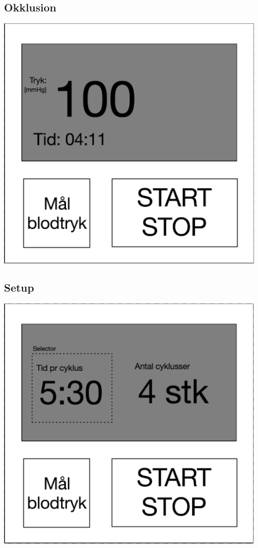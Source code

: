 \subsection{Okklusion}
\includegraphics[width=\textwidth]{Illustrationer/OkklusionGUI}

\subsection{Setup}
\includegraphics[width=\textwidth]{Illustrationer/SetupGUI}


